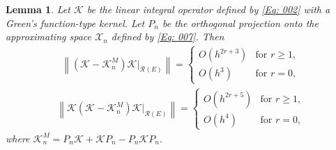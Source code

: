 \documentclass[pdflatex, sn-mathphys-num]{sn-jnl}%
\newcommand{\norm}[1]{\left\lVert #1\right\rVert}
\theoremstyle{thmstyleone}%
\newtheorem{lemma}[theorem]{Lemma}
\theoremstyle{thmstyletwo}%
\theoremstyle{thmstylethree}%
\begin{document}
\begin{lemma} \label{lem2}
	Let $ \mathcal{K}$ be the linear integral operator defined by \eqref{Eq: 002} with a Green's function-type kernel. Let $P_n$ be the orthogonal projection onto the approximating space $\mathcal{X}_n$ defined by \eqref{Eq: 007}. Then
	\begin{eqnarray*}
		\norm{(\mathcal{K} - \mathcal{K}_n^M) \mathcal{K} |_{\mathcal{R}(E)}} =
		\begin{cases}
			O\left(h^{2r+3} \right) & \text{for } r \geq 1, \\
			O\left(h^{3} \right) & \text{for } r = 0,
		\end{cases}
	\end{eqnarray*}
	\begin{eqnarray*}
		\norm{\mathcal{K} (\mathcal{K} - \mathcal{K}_n^M) \mathcal{K} |_{\mathcal{R}(E)}} =
		\begin{cases}
			O\left(h^{2r+5} \right) & \text{for } r \geq 1, \\
			O\left(h^{4} \right) & \text{for } r = 0,
		\end{cases}
	\end{eqnarray*}
	where $\mathcal{K}_n^M= P_n \mathcal{K} + \mathcal{K} P_n - P_n \mathcal{K} P_n.$
\end{lemma}
\end{document}
